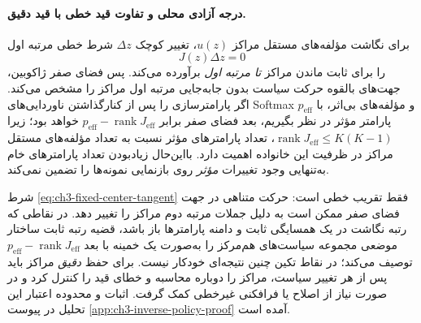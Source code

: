 \paragraph{درجه آزادی محلی و تفاوت قید خطی با قید دقیق.}
برای نگاشت مؤلفه‌های مستقل مراکز
$u(z)$، تغییر کوچک $\Delta z$
شرط خطی مرتبه اول
\begin{equation}\label{eq:ch3-fixed-center-tangent}
\boxed{
J(z)\Delta z=0
}
\end{equation}
را برای ثابت ماندن مراکز
\emph{تا مرتبه اول} برآورده می‌کند.
پس فضای صفر ژاکوبین،
جهت‌های بالقوه حرکت سیاست
بدون جابه‌جایی مرتبه اول مراکز را
مشخص می‌کند. اگر پارامترسازی را
پس از کنارگذاشتن ناوردایی‌های
Softmax و مؤلفه‌های بی‌اثر،
با $p_{\mathrm{eff}}$ پارامتر مؤثر
در نظر بگیریم، بعد فضای صفر
برابر $p_{\mathrm{eff}}-\operatorname{rank}J_{\mathrm{eff}}$
خواهد بود؛ زیرا
$\operatorname{rank}J_{\mathrm{eff}}\le K(K-1)$،
تعداد پارامترهای مؤثر نسبت به
تعداد مؤلفه‌های مستقل مراکز
در ظرفیت این خانواده اهمیت دارد.
بااین‌حال زیادبودن تعداد
پارامترهای خام به‌تنهایی
وجود تغییرات \emph{مؤثر}
روی بازنمایی نمونه‌ها را
تضمین نمی‌کند.

شرط
\eqref{eq:ch3-fixed-center-tangent}
فقط تقریب خطی است:
حرکت متناهی در جهت
فضای صفر ممکن است به دلیل
جملات مرتبه دوم مراکز را
تغییر دهد. در نقاطی که
رتبه نگاشت در یک همسایگی
ثابت و دامنه پارامترها
باز باشد، قضیه رتبه ثابت
ساختار موضعی مجموعه
سیاست‌های هم‌مرکز را
به‌صورت یک خمینه با
بعد $p_{\mathrm{eff}}-\operatorname{rank}J_{\mathrm{eff}}$
توصیف می‌کند؛ در نقاط تکین
چنین نتیجه‌ای خودکار نیست.
برای حفظ \emph{دقیق} مراکز
باید پس از هر تغییر سیاست،
مراکز را دوباره محاسبه
و خطای قید را کنترل کرد
و در صورت نیاز از اصلاح
یا فرافکنی غیرخطی کمک گرفت.
اثبات و محدوده اعتبار
این تحلیل در پیوست
\ref{app:ch3-inverse-policy-proof}
آمده است.



